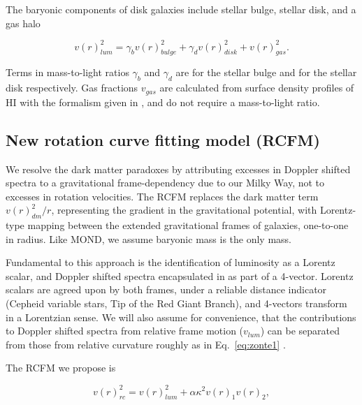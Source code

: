 \documentclass[reprint,%
 amsmath,amssymb,
 aps,
]{revtex4-1}
\begin{document}
  

The baryonic components of disk   galaxies include stellar bulge, stellar disk, and a gas halo
  
   \begin{equation}
v(r)_{lum}^2 = \gamma_b v(r)_{bulge}^2 +  \gamma_d v(r)_{disk}^2 + v(r)_{gas}^2.  
\label{eq:zonte3}
\end{equation} 
  
Terms in mass-to-light ratios $\gamma_b$ and $\gamma_d$ are   for the stellar bulge and for the stellar disk      respectively. 
  Gas fractions $v_{gas}$ are calculated from surface density profiles of HI  with the formalism given in  \cite{1983MNRAS.203..735C}, and do not require  a mass-to-light ratio.  
  
 


\subsection{New rotation curve fitting model (RCFM)}

We resolve the dark matter    paradoxes    by  attributing excesses in Doppler shifted spectra to  a gravitational frame-dependency  due to our Milky Way, not to excesses in rotation velocities.  
The   RCFM  
replaces the dark matter term $v(r)^2_{dm}/r$,  representing the gradient in the gravitational potential,       with  Lorentz-type mapping between the extended gravitational frames of galaxies, one-to-one in radius.  Like MOND, we   assume baryonic mass is the only mass. 


Fundamental to this approach is the   identification of  luminosity   as a Lorentz scalar, and Doppler shifted spectra encapsulated in  
   as part of a 4-vector. Lorentz scalars are agreed upon by both frames, under a reliable distance indicator  (Cepheid variable stars, Tip of the Red Giant Branch), and 4-vectors transform in a Lorentzian sense.  
We   will also assume for convenience,  that the contributions to  Doppler shifted spectra from  relative frame  motion ($v_{lum}$) can be  separated from those from relative curvature roughly as in Eq.~\ref{eq:zonte1} \cite{Jack,Cisn}.  


 
 
   
   The RCFM we propose  is
   

\begin{equation}
v(r)_{rc}^2 =  v(r)_{lum}^2+\alpha \kappa^2 v(r)_{1} v(r)_{2},  
\label{eq:zonteLCM}
\end{equation}  
\end{document}
